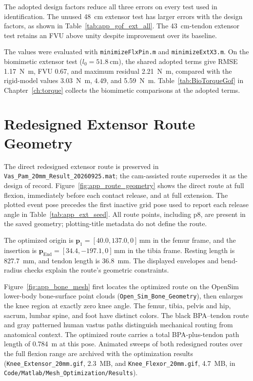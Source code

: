 The adopted design factors reduce all three errors on every test used in identification. The unused \qty{48}{\cm} extensor test has larger errors with the design factors, as shown in Table~\ref{tab:app_gof_ext_all}. The \qty{43}{\cm}-tendon extensor test retains an FVU above unity despite improvement over its baseline.

The values were evaluated with \nolinkurl{minimizeFlxPin.m} and \nolinkurl{minimizeExtX3.m}. On the biomimetic extensor test ($l_0=\qty{51.8}{\cm}$), the shared adopted terms give RMSE \qty{1.17}{\N\m}, FVU 0.67, and maximum residual \qty{2.21}{\N\m}, compared with the rigid-model values \qty{3.03}{\N\m}, 4.49, and \qty{5.59}{\N\m}. Table~\ref{tab:BioTorqueGof} in Chapter~\ref{ch:torque} collects the biomimetic comparisons at the adopted terms.

\section{Redesigned Extensor Route Geometry}\label{app:route_geometry}

The direct redesigned extensor route is preserved in \nolinkurl{Vas_Pam_20mm_Result_20260925.mat}; the cam-assisted route supersedes it as the design of record. Figure~\ref{fig:app_route_geometry} shows the direct route at full flexion, immediately before each contact release, and at full extension. The plotted event pose precedes the first inactive grid pose used to report each release angle in Table~\ref{tab:app_ext_seed}. All route points, including p8, are present in the saved geometry; plotting-title metadata do not define the route.

The optimized origin is $\mathbf p_1=[40.0,137.0,0]\,\unit{\mm}$ in the femur frame, and the insertion is $\mathbf p_{\mathrm{End}}=[34.4,-197.1,0]\,\unit{\mm}$ in the tibia frame. Resting length is \qty{827.7}{\mm}, and tendon length is \qty{36.8}{\mm}. The displayed envelopes and bend-radius checks explain the route's geometric constraints.

Figure~\ref{fig:app_bone_mesh} first locates the optimized route on the OpenSim lower-body bone-surface point clouds (\texttt{Open\_Sim\_Bone\_Geometry}), then enlarges the knee region at exactly zero knee angle. The femur, tibia, pelvis and hip, sacrum, lumbar spine, and foot have distinct colors. The black BPA--tendon route and gray patterned human vastus paths distinguish mechanical routing from anatomical context. The optimized route carries a total BPA-plus-tendon path length of \qty{0.784}{\m} at this pose. Animated sweeps of both redesigned routes over the full flexion range are archived with the optimization results (\texttt{Knee\_Extensor\_20mm.gif}, 2.3~MB, and \texttt{Knee\_Flexor\_20mm.gif}, 4.7~MB, in \texttt{Code/Matlab/Mesh\_Optimization/Results}).

